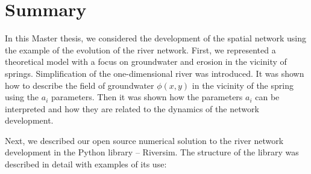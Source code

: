 \documentclass[]{pracamgr}
\begin{document}
  \chapter{Summary}

    In this Master thesis, we considered the development of the spatial network using the example of the evolution of the river network. First, we represented a theoretical model with a focus on groundwater and erosion in the vicinity of springs. Simplification of the one-dimensional river was introduced. It was shown how to describe the field of groundwater $\phi(x, y)$ in the vicinity of the spring using the $a_i$ parameters. Then it was shown how the parameters $a_i$ can be interpreted and how they are related to the dynamics of the network development.\par

    Next, we described our open source numerical solution to the river network development in the Python library -- Riversim. The structure of the library was described in detail with examples of its use: 
    
\end{document}
